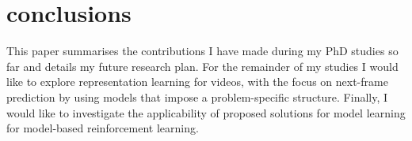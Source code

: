 \section{conclusions}
\label{sec:conclusions}

    This paper summarises the contributions I have made during my PhD studies so far and details my future research plan. For the remainder of my studies I would like to explore representation learning for videos, with the focus on next-frame prediction by using models that impose a problem-specific structure. Finally, I would like to investigate the applicability of proposed solutions for model learning for model-based reinforcement learning.